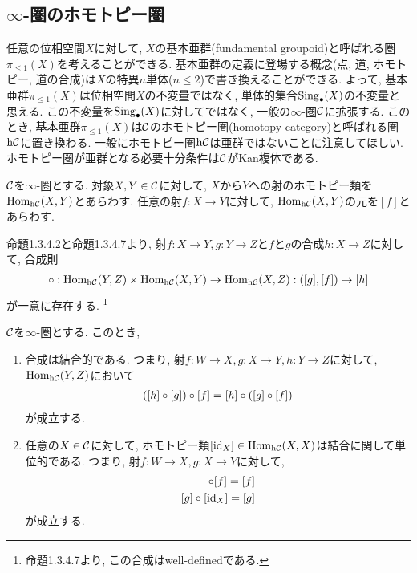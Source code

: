 \documentclass[uplatex, a4paper, 14Q, dvipdfmx]{jsreport}
\begin{document}
\subsection{\texorpdfstring{$\infty$}{infty}-圏のホモトピー圏}

任意の位相空間$X$に対して, $X$の基本亜群(fundamental groupoid)と呼ばれる圏$\pi_{\leq 1}(X)$を考えることができる. 
基本亜群の定義に登場する概念(点, 道, ホモトピー, 道の合成)は$X$の特異$n$単体($n \leq 2$)で書き換えることができる. 
よって, 基本亜群$\pi_{\leq 1}(X)$は位相空間$X$の不変量ではなく, 単体的集合$\mathrm{Sing}_\bullet(X)$の不変量と思える. 
この不変量を$\mathrm{Sing}_\bullet(X)$に対してではなく, 一般の$\infty$-圏$\mathcal{C}$に拡張する. 
このとき, 基本亜群$\pi_{\leq 1}(X)$は$\mathcal{C}$のホモトピー圏(homotopy category)と呼ばれる圏$\mathrm{h} \mathcal{C}$に置き換わる. 
一般にホモトピー圏$\mathrm{h} \mathcal{C}$は亜群ではないことに注意してほしい. 
ホモトピー圏が亜群となる必要十分条件は$\mathcal{C}$がKan複体である. \cite[\href{https://kerodon.net/tag/019D}{Tag 019D}]{kerodon}

\begin{cons}
  $\mathcal{C}$を$\infty$-圏とする. 
  対象$X,Y \in \mathcal{C}$に対して, $X$から$Y$への射のホモトピー類を$\mathrm{Hom}_{\mathrm{h} \mathcal{C}}(X,Y)$とあらわす. 
  任意の射$f: X \to Y$に対して, $\mathrm{Hom}_{\mathrm{h} \mathcal{C}}(X,Y)$の元を$[f]$とあらわす. 

  命題1.3.4.2と命題1.3.4.7より, 射$f: X \to Y, g: Y \to Z$と$f$と$g$の合成$h: X \to Z$に対して, 合成則
  \begin{align*}
    \circ: \mathrm{Hom}_{\mathrm{h} \mathcal{C}}(Y,Z) \times \mathrm{Hom}_{\mathrm{h} \mathcal{C}}(X,Y) \to \mathrm{Hom}_{\mathrm{h} \mathcal{C}}(X,Z): ([g],[f]) \mapsto [h] 
  \end{align*}
  が一意に存在する. 
  \footnote{
    命題1.3.4.7より, この合成はwell-definedである.
  }
\end{cons}

\begin{prop}
  $\mathcal{C}$を$\infty$-圏とする. 
  このとき, 
  \begin{enumerate}
    \item 
    合成は結合的である. 
    つまり, 射$f: W \to X, g: X \to Y, h: Y \to Z$に対して, $\mathrm{Hom}_{\mathrm{h} \mathcal{C}}(Y,Z)$において
    \begin{align*}
      ([h] \circ [g]) \circ [f] = [h] \circ ([g] \circ [f])
    \end{align*}
    が成立する. 
    \item 
    任意の$X \in \mathcal{C}$に対して, ホモトピー類$[\mathrm{id}_X] \in \mathrm{Hom}_{\mathrm{h} \mathcal{C}}(X,X)$は結合に関して単位的である. 
    つまり, 射$f: W \to X, g: X \to Y$に対して, 
    \begin{align*}
      [\id_X] \ci [f] = [f] \\
      [g] \ci [\id_X] = [g]
    \end{align*}
    が成立する. 
  \end{enumerate}
\end{prop}
\end{document}
